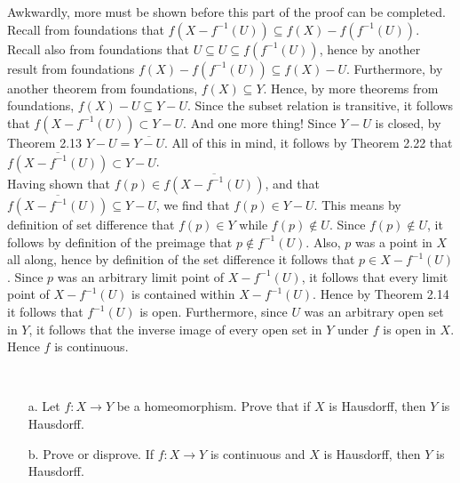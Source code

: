 \documentclass{article}
\newcommand{\inv}[1]{#1^{-1}}
\newcommand{\inv}[1]{#1^{-1}}
\begin{document}
\begin{itemize}
    Awkwardly, more must be shown before this part of the proof can be completed. Recall from foundations that $f(X- \inv{f}(U))\subseteq f(X)-f(\inv{f}(U))$. Recall also from foundations that $U \subseteq U\subseteq f(\inv{f}(U))$, hence by another result from foundations $f(X)-f(\inv{f}(U))\subseteq f(X) - U$. Furthermore, by another theorem from foundations, $f(X)\subseteq Y$. Hence, by more theorems from foundations, $f(X)- U\subseteq Y-U$. Since the subset relation is transitive, it follows that $f(X- \inv{f}(U)) \subset Y - U$. And one more thing! Since $Y-U$ is closed, by Theorem 2.13 $Y-U = \overline{Y - U}$. All of this in mind, it follows by Theorem 2.22 that  $\overline{f(X- \inv{f}(U))}\subset Y - U$.\\
    
    Having shown that $f(p)\in \overline{f(X-\inv{f}(U))}$, and that $\overline{f(X-\inv{f}(U))} \subseteq Y - U $, we find that $f(p) \in Y - U $. This means by definition of set difference that $f(p)\in Y$ while $f(p)\not \in U$. Since $f(p)\not \in U$, it follows by definition of the preimage that $p\not\in \inv{f}(U)$. Also, $p$ was a point in $X$ all along, hence by definition of the set difference it follows that $p\in X - \inv{f}(U)$. Since $p$ was an arbitrary limit point of $X - \inv{f}(U)$, it follows that every limit point of $X - \inv{f}(U)$ is contained within $X - \inv{f}(U)$. Hence by Theorem 2.14 it follows that $\inv{f}(U)$ is open. Furthermore, since $U$ was an arbitrary open set in $Y$, it follows that the inverse image of every open set in $Y$ under $f$ is open in $X$. Hence $f$ is continuous.
\end{itemize}
\\

  \begin{itemize}
    \item[a. ] Let $f: X \rightarrow Y$ be a homeomorphism.  Prove that if $X$ is Hausdorff, then $Y$ is Hausdorff.
    \item[b. ] Prove or disprove.  If $f: X \rightarrow Y$ is continuous and $X$ is Hausdorff, then $Y$ is Hausdorff.
\end{itemize}
\end{document}
